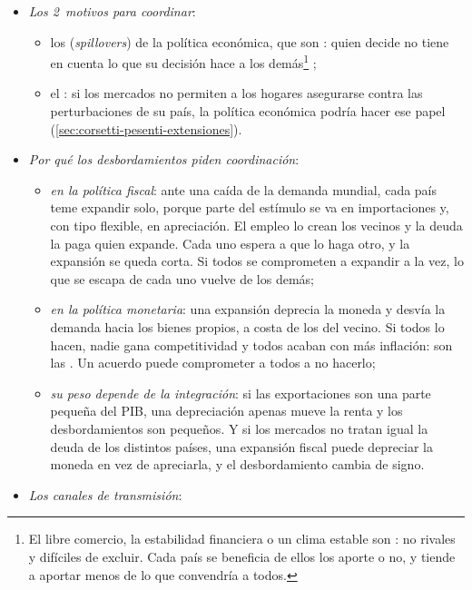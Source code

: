 \documentclass[11pt]{article}
\begin{document}
\begin{itemize}
\item \emph{Los 2~motivos para coordinar}\nocite{Bergin2008Palgrave}:
  \begin{itemize}
  \item los  (\emph{spillovers}) de la política económica, que son : quien decide no tiene en cuenta lo que su decisión hace a los demás\footnote{El libre comercio, la estabilidad financiera o un clima estable son : no rivales y difíciles de excluir. Cada país se beneficia de ellos los aporte o no, y tiende a aportar menos de lo que convendría a todos.} ;
  \item el : si los mercados no permiten a los hogares asegurarse contra las perturbaciones de su país, la política económica podría hacer ese papel (\ref{sec:corsetti-pesenti-extensiones}).
  \end{itemize}
\item \emph{Por qué los desbordamientos piden coordinación}:
  \begin{itemize}
  \item \emph{en la política fiscal}: ante una caída de la demanda mundial, cada país teme expandir solo, porque parte del estímulo se va en importaciones y, con tipo flexible, en apreciación. El empleo lo crean los vecinos y la deuda la paga quien expande. Cada uno espera a que lo haga otro, y la expansión se queda corta. Si todos se comprometen a expandir a la vez, lo que se escapa de cada uno vuelve de los demás;
  \item \emph{en la política monetaria}: una expansión deprecia la moneda y desvía la demanda hacia los bienes propios, a costa de los del vecino. Si todos lo hacen, nadie gana competitividad y todos acaban con más inflación: son las . Un acuerdo puede comprometer a todos a no hacerlo;
  \item \emph{su peso depende de la integración}: si las exportaciones son una parte pequeña del PIB, una depreciación apenas mueve la renta y los desbordamientos son pequeños. Y si los mercados no tratan igual la deuda de los distintos países, una expansión fiscal puede depreciar la moneda en vez de apreciarla, y el desbordamiento cambia de signo.
  \end{itemize}
\item \emph{Los canales de transmisión}:
  \begin{itemize}

\end{itemize}
\end{itemize}
\end{document}
